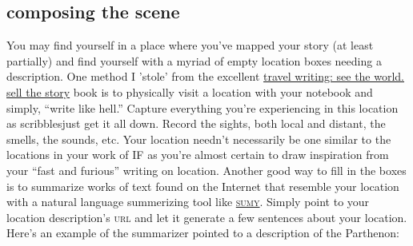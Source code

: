 \subsection{composing the scene}
You may find
\reversemarginpar
{}
 yourself in a place where you've mapped your story (at least
partially) and find yourself with a myriad of empty location boxes needing a
description. One method I 'stole' from the excellent
\href{https://www.amazon.com/Travel-Writing-World-Sell-Story/dp/1582973814}{travel
writing: see the world. sell the story} book is to physically visit a location
with your notebook and simply, ``write like hell.'' Capture everything you're
experiencing in this location as scribbles\textemdash just get it all down. 
\normalmarginpar
{}
Record the sights, both local and distant, the smells, the sounds, etc. Your
location needn't necessarily be one similar to the locations in your work of IF
as you're almost certain to draw inspiration from your ``fast and furious''
writing on location.
\reversemarginpar
{}
Another good way to fill in the boxes is to summarize works of text found on the
Internet that resemble your location with a natural language summerizing tool
like \href{https://github.com/miso-belica/sumy}{\textsc{sumy}}. Simply point
to your location description's \textsc{url} and let it generate a few
sentences about your location. Here's an example of the summarizer pointed to a
description of the Parthenon:

